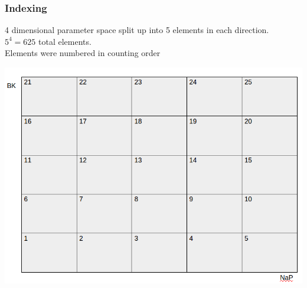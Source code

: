 \documentclass{beamer}
\theoremstyle{plain}
\theoremstyle{definition}
\begin{document}
\begin{frame}\frametitle{Indexing}
  4 dimensional parameter space split up into 5 elements in each direction. $5^4 = 625$ total elements.\\
  \vspace{1em}
  Elements were numbered in counting order

  \begin{center}
    \includegraphics[scale=.25]{indexing.png}%
  \end{center}
\end{frame}
\end{document}
